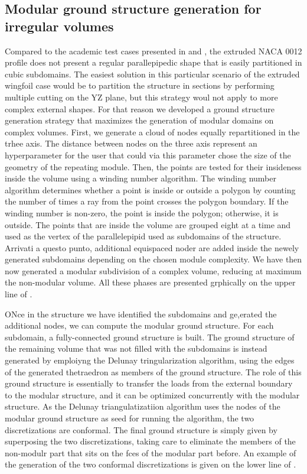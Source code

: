 \subsection{Modular ground structure generation for irregular volumes}
Compared to the academic test cases presented in  and , the extruded NACA 0012 profile does not present a regular parallepipedic shape that is easily partitioned in cubic subdomains. The easiest solution in this particular scenario of the extruded wingfoil case would be to partition the structure in sections by performing multiple cutting on the YZ plane, but this strategy woul not apply to more complex external shapes. For that reason we developed a ground structure generation strategy that maximizes the generation of modular domains on complex volumes. First, we generate a cloud of nodes equally repartitioned in the trhee axis. The distance between nodes on the three axis represent an hyperparameter for the user that could via this parameter chose the size of the geometry of the repeating module. Then, the points are tested for their insideness inside the volume using a winding number algorithm. The winding number algorithm determines whether a point is inside or outside a polygon by counting the number of times a ray from the point crosses the polygon boundary. If the winding number is non-zero, the point is inside the polygon; otherwise, it is outside. The points that are inside the volume are grouped eight at a time and used as the vertex of the parallelepipid used as subdomains of the structure. Arrivati a questo punto, additional equispaced noder are added inside the newely generated subdomains depending on the chosen module complexity. We have then now generated a modular subdivision of a complex volume, reducing at maximum the non-modular volume. All these phases are presented grphically on the upper line of .

ONce in the structure we have identified the subdomains and ge,erated the additional nodes, we can compute the modular ground structure. For each subdomain, a fully-connected ground structure is built. The ground structure of the remaining volume that was not filled with the subdomains is instead generated by emploiyng the Delunay tringularization algorithm, using the edges of the generated thetraedron as members of the ground structure. The role of this ground structure is essentially to transfer the loads from the external boundary to the modular structure, and it can be optimized concurrently with the modular structure. As the Delunay triangulatizatiion algorithm uses the nodes of the modular ground structure as seed for running the algorithm, the two discretizations are conformal. The final ground structure is simply given by superposing the two discretizations, taking care to eliminate the members of the non-modulr part that sits on the fces of the modular part before. An example of the generation of the two conformal discretizations is given on the lower line of .

